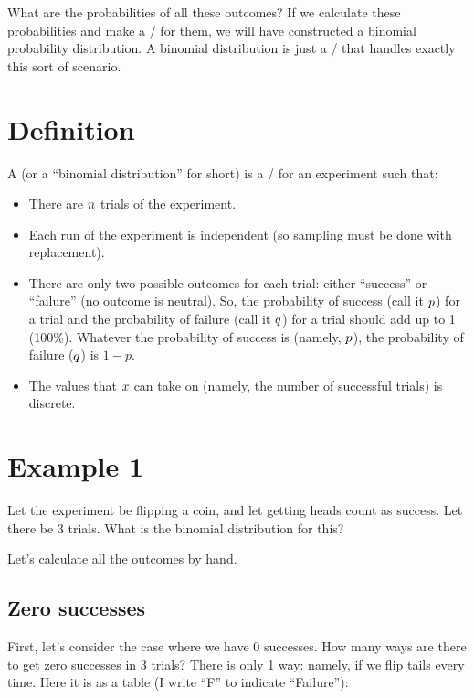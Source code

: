 \documentclass[../../../main.tex]{subfiles}
\begin{document}
What are the probabilities of all these outcomes? If we calculate these probabilities and make a \PDFtext/ for them, we will have constructed a binomial probability distribution. A binomial distribution is just a \PDFtext/ that handles exactly this sort of scenario.


\section{Definition}

A  (or a ``binomial distribution'' for short) is a \PDFtext/ for an experiment such that:

\begin{itemize}
  \item There are $\numTrials/$ trials of the experiment.
  \item Each run of the experiment is independent (so sampling must be done with replacement).
  \item There are only two possible outcomes for each trial: either ``success'' or ``failure'' (no outcome is neutral). So, the probability of success (call it $\success/$) for a trial and the probability of failure (call it $\failure/$) for a trial should add up to 1 (100\%). Whatever the probability of success is (namely, $\success/$), the probability of failure ($\failure/$) is $1 - p$.
  \item The values that $\RandVarVal/$ can take on (namely, the number of successful trials) is discrete.
\end{itemize}


\section{Example 1}

Let the experiment be flipping a coin, and let getting heads count as success. Let there be 3 trials. What is the binomial distribution for this?

Let's calculate all the outcomes by hand. 


\subsection{Zero successes}

First, let's consider the case where we have 0 successes. How many ways are there to get zero successes in 3 trials? There is only 1 way: namely, if we flip tails every time. Here it is as a table (I write ``F'' to indicate ``Failure''):
\end{document}
